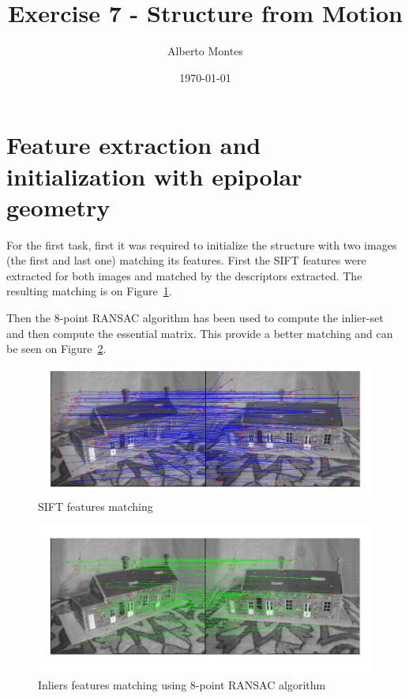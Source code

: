 \documentclass{ethz_report}
\title{Exercise 7 - Structure from Motion}
\author{Alberto Montes}
\date{\today}
\begin{document}
\maketitle

\section*{Feature extraction and initialization with epipolar geometry}

For the first task, first it was required to initialize the structure with two images (the first and last one) matching its features. First the SIFT features were extracted for both images and matched by the descriptors extracted. The resulting matching is on Figure~\ref{fig:sift_feat_matching}.

Then the 8-point RANSAC algorithm has been used to compute the inlier-set and then compute the essential matrix. This provide a better matching and can be seen on Figure~\ref{fig:init_inliers}.

\begin{figure}[H]
    \centering
    \includegraphics[width=1\linewidth]{images/ini_raw}
    \caption{SIFT features matching}
    \label{fig:sift_feat_matching}
\end{figure}

\begin{figure}[H]
    \centering
    \includegraphics[width=1\linewidth]{images/ini_inliers}
    \caption{Inliers features matching using 8-point RANSAC algorithm}
    \label{fig:init_inliers}
\end{figure}
\end{document}
